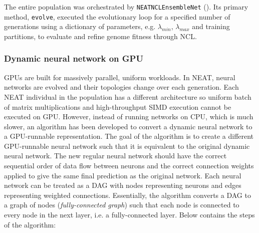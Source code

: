 \documentclass{article}
\begin{document}
The entire population was orchestrated by \texttt{NEATNCLEnsembleNet} (). Its primary method, \texttt{evolve}, executed the evolutionary loop for a specified number of generations using a dictionary of parameters, e.g. $\lambda_{min}$, $\lambda_{max}$ and training partitions, to evaluate and refine genome fitness through NCL. 


\subsubsection{Dynamic neural network on GPU}
\label{subsubsec:dynamic_nn_on_gpu}
GPUs are built for massively parallel, uniform workloads. In NEAT, neural networks are evolved and their topologies change over each generation. Each NEAT individual in the population has a different architecture so uniform batch of matrix multiplications and high-throughput SIMD execution cannot be executed on GPU. 
However, instead of running networks on CPU, which is much slower, an algorithm has been developed to convert a dynamic neural network to a GPU-runnable representation. The goal of the algorithm is to create a different GPU-runnable neural network such that it is equivalent to the original dynamic neural network. The new regular neural network should have the correct sequential order of data flow between neurons and the correct connection weights applied to give the same final prediction as the original network. 
Each neural network can be treated as a DAG with nodes representing neurons and edges representing weighted connections. Essentially, the algorithm converts a DAG to a graph of nodes (\textit{fully-connected graph}) such that each node is connected to every node in the next layer, i.e. a fully-connected layer. 
Below contains the steps of the algorithm: 
\end{document}
